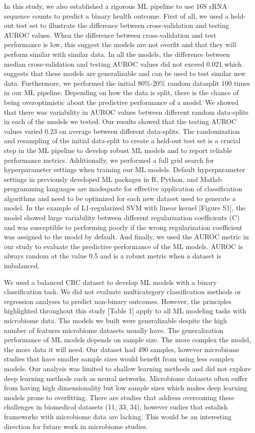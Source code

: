 \documentclass[11pt,]{article}
\begin{document}
In this study, we also established a rigorous ML pipeline to use 16S
rRNA sequence counts to predict a binary health outcome. First of all,
we used a held-out test set to illustrate the difference between
cross-validation and testing AUROC values. When the difference between
cross-validation and test performance is low, this suggest the models
are not overfit and that they will perform similar with similar data. In
all the models, the difference between median cross-validation and
testing AUROC values did not exceed 0.021 which suggests that these
models are generalizable and can be used to test similar new data.
Furthermore, we performed the initial 80\%-20\% random datasplit 100
times in our ML pipeline. Depending on how the data is split, there is
the chance of being overoptimistic about the predictive performance of a
model. We showed that there was variability in AUROC values between
different random data-splits in each of the models we tested. Our
results showed that the testing AUROC values varied 0.23 on average
between different data-splits. The randomization and resampling of the
initial data-split to create a held-out test set is a crucial step in
the ML pipeline to develop robust ML models and to report reliable
performance metrics. Additionally, we performed a full grid search for
hyperparameter settings when training our ML models. Default
hyperparameter settings in previously developed ML packages in R,
Python, and Matlab programming languages are inadequate for effective
application of classification algorithms and need to be optimized for
each new dataset used to generate a model. In the example of
L1-regularized SVM with linear kernel {[}Figure S1{]}, the model showed
large variability between different regularization coefficients (C) and
was susceptible to performing poorly if the wrong regularization
coefficient was assigned to the model by default. And finally, we used
the AUROC metric in our study to evaluate the predictive performance of
the ML models. AUROC is always random at the value 0.5 and is a robust
metric when a dataset is imbalanced.

We used a balanced CRC dataset to develop ML models with a binary
classification task. We did not evaluate multicategory classification
methods or regression analyses to predict non-binary outcomes. However,
the principles highlighted throughout this study {[}Table 1{]} apply to
all ML modeling tasks with microbiome data. The models we built were
generalizable despite the high number of features microbiome datasets
usually have. The generalization performance of ML models depends on
sample size. The more complex the model, the more data it will need. Our
dataset had 490 samples, however microbiome studies that have smaller
sample sizes would benefit from using less complex models. Our analysis
was limited to shallow learning methods and did not explore deep
learning methods such as neural networks. Microbiome datasets often
suffer from having high dimensionality but low sample sizes which makes
deep learning models prone to overfitting. There are studies that
address overcoming these challenges in biomedical datasets (11, 33, 34),
however sudies that estalish frameworks with microbiome data are
lacking. This would be an interesting direction for future work in
microbiome studies.
\end{document}
